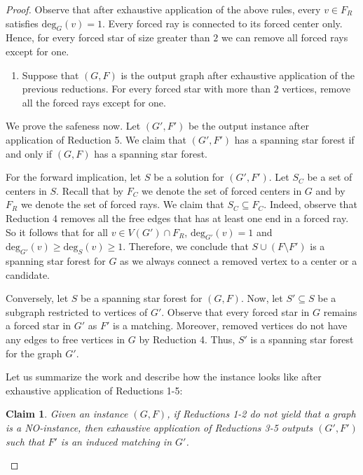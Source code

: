 \documentclass[en]{pracamgr}
\newtheorem{claim}{Claim}
\theoremstyle{definition}
\newcommand{\ssf}{spanning star forest}
\newcommand{\degree}[2]{\textrm{deg}_{#1}(#2)}
\begin{document}
\begin{proof}
	Observe that after exhaustive application of the above rules, every $v \in F_R$ satisfies $\degree{G}{v}=1$. Every forced ray is connected to its forced center only. Hence, for every forced star of size greater than $2$ we can remove all forced rays except for one.


	\begin{enumerate}[leftmargin=*,label=\textbf{Reduction \arabic{enumi}},resume,wide, labelwidth=!, labelindent=0pt]
		\item Suppose that $(G,F)$ is the output graph after exhaustive application of the previous reductions. For every forced star with more than $2$ vertices, remove all the forced rays except for one.
	\end{enumerate}

	We prove the safeness now. Let $(G',F')$ be the output instance after application of Reduction 5. We claim that $(G',F')$ has a \ssf{} if and only if $(G,F)$ has a \ssf{}. 
	
	For the forward implication, let $S$ be a solution for $(G',F')$. Let $S_C$ be a set of centers in $S$. Recall that by $F_C$ we denote the set of forced centers in $G$ and by $F_R$ we denote the set of forced rays. We claim that $S_C \subseteq F_C$. Indeed, observe that Reduction 4 removes all the free edges that has at least one end in a forced ray. So it follows that for all $v \in V(G') \cap F_R$, $\degree{G'}{v}=1$ and $\degree{G'}{v} \geq \degree{S}{v} \geq 1$. Therefore, we conclude that $S \cup (F \setminus F')$ is a spanning star forest for $G$ as we always connect a removed vertex to a center or a candidate.
	
	Conversely, let $S$ be a spanning star forest for $(G,F)$. Now, let $S' \subseteq S$ be a subgraph restricted to vertices of $G'$. Observe that every forced star in $G$ remains a forced star in $G'$ as $F'$ is a matching. Moreover, removed vertices do not have any edges to free vertices in $G$ by Reduction 4. Thus, $S'$ is a spanning star forest for the graph $G'$.

	Let us summarize the work and describe how the instance looks like after exhaustive application of Reductions 1-5:

	\begin{claim}
		Given an instance $(G,F)$, if Reductions 1-2 do not yield that a graph is a NO-instance, then exhaustive application of Reductions 3-5 outputs $(G',F')$ such that $F'$ is an induced matching in $G'$.
	\end{claim}
	

\end{proof}
\end{document}
